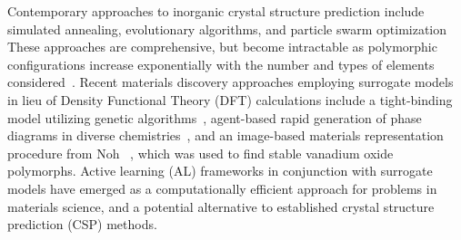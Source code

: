 %
%
%
Contemporary approaches to inorganic crystal structure prediction %
include simulated annealing, evolutionary algorithms, and particle swarm optimization
\cite{Oganov2006,Lyakhov2010,Glass2006,Wang2012,Pickard2011,Pickard2006,Avery2019,Lonie2011}
%
These approaches are comprehensive, but become intractable as  %
polymorphic configurations increase exponentially with the number and types of elements considered~\cite{Stillinger1999}.
%
%
%
Recent materials discovery approaches employing surrogate models in lieu of Density Functional Theory (DFT) calculations
include a tight-binding model utilizing genetic algorithms~\cite{VanDenBossche2018},
agent-based rapid generation of phase diagrams in diverse chemistries~\cite{Montoya2020},
and an image-based materials representation procedure from Noh ~\cite{noh2019inverse},
which was used to find stable vanadium oxide polymorphs.
Active learning (AL) frameworks in conjunction with surrogate models have emerged as a computationally efficient approach for problems in materials science, and a potential alternative to established crystal structure prediction (CSP) methods.
\cite{hansen2019atomistic,torres2019low,Jennings2019,podryabinkin2017active,Bassman2018}
%

